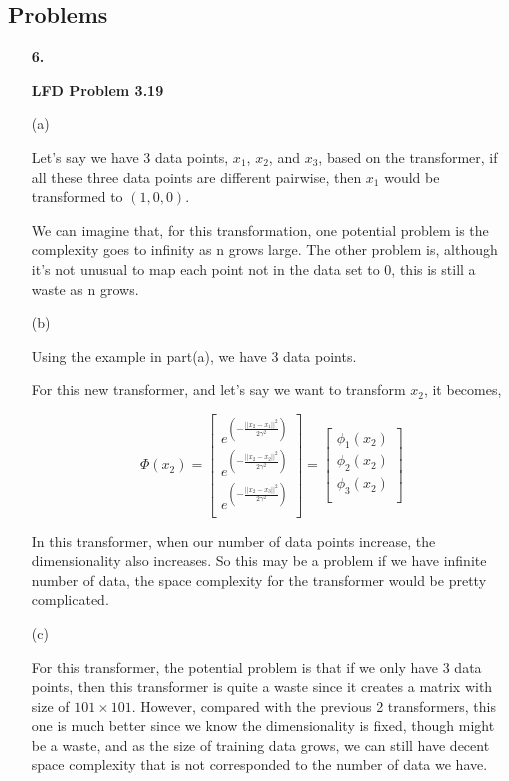 \documentclass[11pt]{article}
\begin{document}
\subsection*{Problems}
\begin{enumerate}
\item[\textbf{6.}]

\textbf{LFD Problem 3.19}

(a)

Let's say we have 3 data points, $x_1$, $x_2$, and $x_3$, based on the transformer, if all these three data points are different pairwise, then $x_1$ would be transformed to $(1,0,0)$.


We can imagine that, for this transformation, one potential problem is the complexity goes to infinity as n grows large. The other problem is, although it's not unusual to map each point not in the data set to 0, this is still a waste as n grows.

(b)

Using the example in part(a), we have 3 data points.

For this new transformer, and let's say we want to transform $x_2$, it becomes, 


\[
\Phi(x_2) = 
\begin{bmatrix}
e^{(-\frac{||x_2-x_1||^2}{2\gamma^2})}\\
e^{(-\frac{||x_2-x_2||^2}{2\gamma^2})}\\
e^{(-\frac{||x_2-x_3||^2}{2\gamma^2})}\\
\end{bmatrix}
=
\begin{bmatrix}
\phi_1(x_2)\\
\phi_2(x_2)\\
\phi_3(x_2)\\
\end{bmatrix}
\]

In this transformer, when our number of data points increase, the dimensionality also increases. So this may be a problem if we have infinite number of data, the space complexity for the transformer would be pretty complicated.

(c)

For this transformer, the potential problem is that if we only have 3 data points, then this transformer is quite a waste since it creates a matrix with size of ${101 \times 101}$. However, compared with the previous 2 transformers, this one is much better since we know the dimensionality is fixed, though might be a waste, and as the size of training data grows, we can still have decent space complexity that is not corresponded to the number of data we have.





\end{enumerate}
\end{document}
